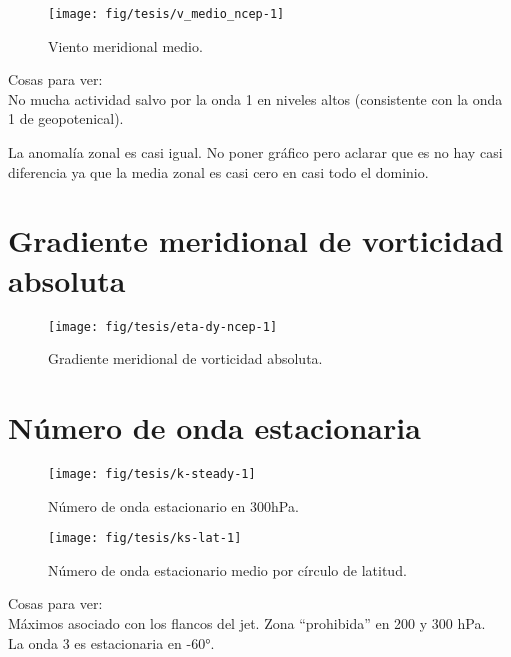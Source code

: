 \documentclass[spanish,a4paper]{book}
\begin{document}
\begin{figure}

{\centering \texttt{[image: fig/tesis/v\_medio\_ncep-1]} 

}

\caption{Viento meridional medio.}\label{fig:v_medio_ncep}
\end{figure}

Cosas para ver:\\
No mucha actividad salvo por la onda 1 en niveles altos (consistente con
la onda 1 de geopotenical).

La anomalía zonal es casi igual. No poner gráfico pero aclarar que es no
hay casi diferencia ya que la media zonal es casi cero en casi todo el
dominio.

\section{Gradiente meridional de vorticidad
absoluta}\label{gradiente-meridional-de-vorticidad-absoluta}

\begin{figure}

{\centering \texttt{[image: fig/tesis/eta-dy-ncep-1]} 

}

\caption{Gradiente meridional de vorticidad absoluta.}\label{fig:eta-dy-ncep}
\end{figure}

\section{Número de onda estacionaria}\label{numero-de-onda-estacionaria}

\begin{figure}
\texttt{[image: fig/tesis/k-steady-1]} \caption{Número de onda estacionario en 300hPa.}\label{fig:k-steady}
\end{figure}

\begin{figure}

{\centering \texttt{[image: fig/tesis/ks-lat-1]} 

}

\caption{Número de onda estacionario medio por círculo de latitud.}\label{fig:ks-lat}
\end{figure}

Cosas para ver:\\
Máximos asociado con los flancos del jet. Zona ``prohibida'' en 200 y
300 hPa.\\
La onda 3 es estacionaria en -60°.
\end{document}

